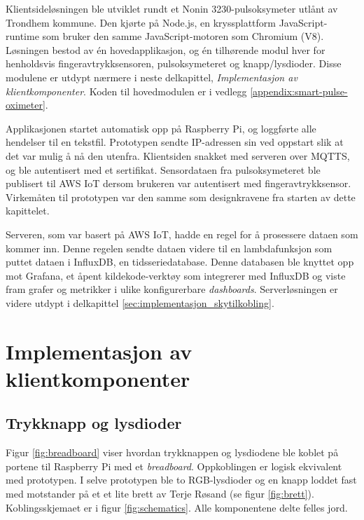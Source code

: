Klientsideløsningen ble utviklet rundt
et Nonin 3230-pulsoksymeter utlånt av Trondhem kommune. Den kjørte på Node.js, en kryssplattform JavaScript-runtime som bruker den
samme JavaScript-motoren som Chromium (V8). Løsningen bestod av én hovedapplikasjon, og én tilhørende modul hver for henholdsvis fingeravtrykksensoren,
pulsoksymeteret og knapp/lysdioder. Disse modulene er utdypt nærmere i neste delkapittel, \textit{Implementasjon av klientkomponenter}.
Koden til hovedmodulen er i vedlegg \ref{appendix:smart-pulse-oximeter}.

Applikasjonen startet automatisk opp på Raspberry Pi, og loggførte alle hendelser til en tekstfil.
Prototypen sendte IP-adressen sin ved oppstart slik at det var mulig å nå den utenfra.
Klientsiden snakket med serveren over MQTTS, og ble autentisert med et sertifikat. Sensordataen fra pulsoksymeteret ble publisert til
AWS IoT dersom brukeren var autentisert med fingeravtrykksensor. Virkemåten til prototypen var den samme som designkravene 
fra starten av dette kapittelet.

Serveren, som var basert på AWS IoT, hadde en
regel for å prosessere dataen som kommer inn. Denne regelen sendte dataen videre til en lambdafunksjon som puttet dataen
i InfluxDB, en tidsseriedatabase. Denne databasen ble knyttet opp mot Grafana, et åpent kildekode-verktøy som integrerer
med InfluxDB og viste fram grafer og metrikker i ulike konfigurerbare \textit{dashboards}.
Serverløsningen er videre utdypt i delkapittel \ref{sec:implementasjon_skytilkobling}.

\section{Implementasjon av klientkomponenter}

\subsection{Trykknapp og lysdioder}
Figur \ref{fig:breadboard} viser hvordan trykknappen og lysdiodene ble koblet på
portene til Raspberry Pi med et \textit{breadboard}. Oppkoblingen er logisk ekvivalent med prototypen.
I selve prototypen ble to RGB-lysdioder og en knapp loddet fast med motstander på et et lite brett av Terje Røsand (se figur \ref{fig:brett}).
Koblingsskjemaet er i figur \ref{fig:schematics}. Alle komponentene delte felles jord.

